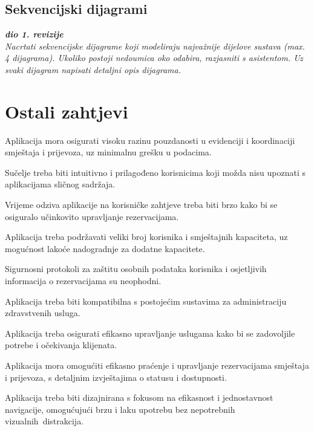 			\subsection{Sekvencijski dijagrami}
				
				\textbf{\textit{dio 1. revizije}}\\
				
				\textit{Nacrtati sekvencijske dijagrame koji modeliraju najvažnije dijelove sustava (max. 4 dijagrama). Ukoliko postoji nedoumica oko odabira, razjasniti s asistentom. Uz svaki dijagram napisati detaljni opis dijagrama.}
				\eject
	
		\section{Ostali zahtjevi}
		
			\begin{packed_item}
				\setlength\itemsep{10pt}
				\item Aplikacija mora osigurati visoku razinu pouzdanosti u evidenciji i koordinaciji smještaja i prijevoza, uz minimalnu grešku u podacima.
				\item Sučelje treba biti intuitivno i prilagođeno korisnicima koji možda nisu upoznati s aplikacijama sličnog sadržaja.
				\item Vrijeme odziva aplikacije na korisničke zahtjeve treba biti brzo kako bi se osiguralo učinkovito upravljanje rezervacijama.
				\item Aplikacija treba podržavati veliki broj korisnika i smještajnih kapaciteta, uz mogućnost lakoće nadogradnje za dodatne kapacitete.
				\item Sigurnosni protokoli za zaštitu osobnih podataka korisnika i osjetljivih informacija o rezervacijama su neophodni.
				\item Aplikacija treba biti kompatibilna s postojećim sustavima za administraciju zdravstvenih usluga.
				\item Aplikacija treba osigurati efikasno upravljanje uslugama kako bi se zadovoljile potrebe i očekivanja klijenata.
				\item Aplikacija mora omogućiti efikasno praćenje i upravljanje rezervacijama smještaja i prijevoza, s detaljnim izvještajima o statusu i dostupnosti.
				\item Aplikacija treba biti dizajnirana s fokusom na efikasnost i jednostavnost navigacije, omogućujući brzu i laku upotrebu bez nepotrebnih vizualnih distrakcija.
			\end{packed_item}
			 
			 
			 
	